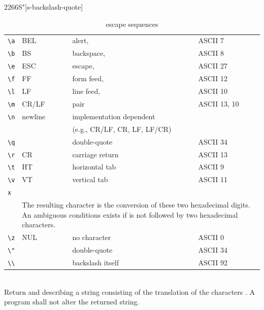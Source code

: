 \begin{worddef}[Seq]{2266}{S\bs"}[s-backslash-quote]
	\begin{table}[ht]
		\caption{ escape sequences}
		\label{table:Seq}
		\begin{center}
\cbstart
			\begin{tabular}[ht]{llll}
				\hline\hline
				\verb|\a|	& BEL		& alert,					& ASCII 7  \\
				\verb|\b|	& BS		& backspace,				& ASCII 8  \\
				\verb|\e|	& ESC		& escape,					& ASCII 27 \\
				\verb|\f|	& FF		& form feed,				& ASCII 12 \\
				\verb|\l|	& LF		& line feed,				& ASCII 10 \\
				\verb|\m|	& CR/LF	& pair						& ASCII 13, 10 \\
				\verb|\n|	& newline& implementation dependent \\
							&			& \multicolumn{2}{l}{(e.g., CR/LF, CR, LF, LF/CR)} \\
				\verb|\q|	&			& double-quote			& ASCII 34 \\
				\verb|\r|	& CR		& carriage return 		& ASCII 13 \\
				\verb|\t|	& HT 		& horizontal tab		& ASCII 9  \\
				\verb|\v|	& VT 		& vertical tab 			& ASCII 11 \\
				\multicolumn{3}{l}{\texttt{\bs{}x}\arg{hexdigit}\arg{hexdigit}} \\
					&\multicolumn{3}{p{21em}}{
						The resulting character is the conversion of these two
						hexadecimal digits. An ambiguous conditions exists if
						\texttt{\bs{x}} is not followed by two hexadecimal characters.} \\
				\verb|\z|	& NUL 		& no character 			& ASCII 0	 \\
				\verb|\"|	& 			& double-quote			& ASCII 34 \\
				\verb|\\|	&			& backslash itself		& ASCII 92 \\
				\hline\hline
			\end{tabular}
\cbend
		\end{center}
	\end{table}

\runtime {} \\
	Return  and  describing a string consisting of
	the translation of the characters .  A program shall not
	alter the returned string.

\end{worddef}


